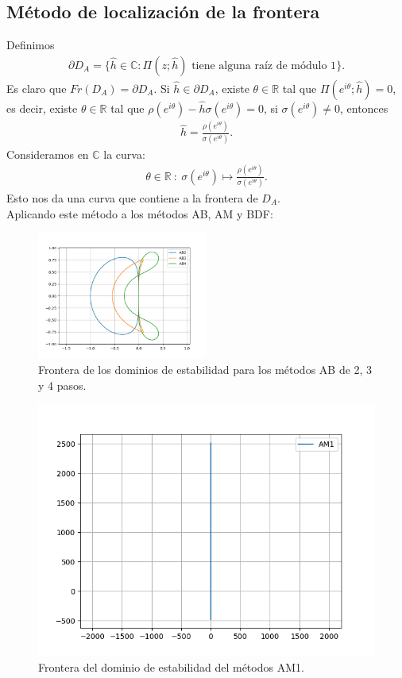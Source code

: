 \subsection{Método de localización de la frontera}
\noindent Definimos
\begin{align*}
    \partial D_A = \{ \hat{h} \in \mathbb{C} : \Pi(z;\hat{h}) \text{ tiene alguna raíz de módulo 1}\}.
\end{align*}
Es claro que $Fr(D_A) = \partial D_A$. Si $\hat{h} \in \partial D_A$, existe $\theta \in \mathbb{R}$ tal que $\Pi(e^{i\theta};\hat{h}) = 0$, es decir, existe $\theta \in \mathbb{R}$ tal que $\rho(e^{i\theta}) - \hat{h}\sigma(e^{i\theta}) = 0$, si $\sigma(e^{i\theta}) \not = 0$, entonces
\begin{align*}
    \hat{h} = \frac{\rho(e^{i\theta})}{\sigma(e^{i\theta})}.
\end{align*}
Consideramos en $\mathbb{C}$ la curva:
\begin{align*}
    \theta \in \mathbb{R} \ : \ \sigma(e^{i\theta}) \longmapsto \frac{\rho(e^{i\theta})}{\sigma(e^{i\theta})}.
\end{align*}
Esto nos da una curva que contiene a la frontera de $D_A$.
\\
\newline
Aplicando este método a los métodos AB, AM y BDF:

\begin{figure}[H]
    \centering
    \includegraphics[width=0.5\textwidth]{imagenes/Metodos_AB.png}
    \caption*{Frontera de los dominios de estabilidad para los métodos AB de 2, 3 y 4 pasos.}
\end{figure}

\begin{figure}[H]
    \centering
    \includegraphics[width=0.5\linewidth]{imagenes/AM1.png}
    \caption*{Frontera del dominio de estabilidad del métodos AM1.}
\end{figure}


